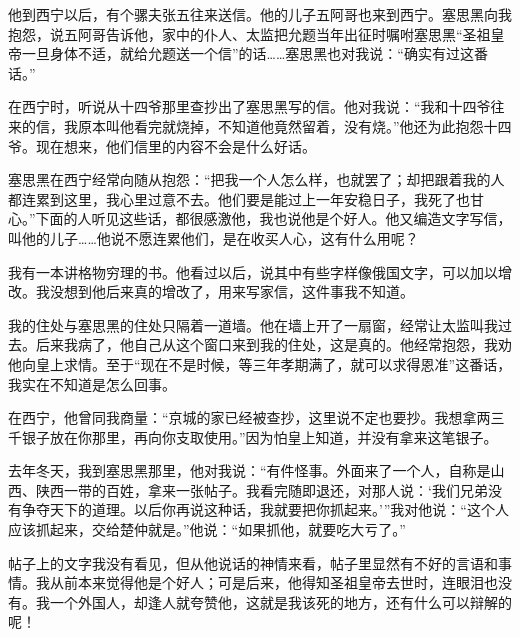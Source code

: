 他到西宁以后，有个骡夫张五往来送信。他的儿子五阿哥也来到西宁。塞思黑向我抱怨，说五阿哥告诉他，家中的仆人、太监把允题当年出征时嘱咐塞思黑“圣祖皇帝一旦身体不适，就给允题送一个信”的话……塞思黑也对我说：“确实有过这番话。”\par
在西宁时，听说从十四爷那里查抄出了塞思黑写的信。他对我说：“我和十四爷往来的信，我原本叫他看完就烧掉，不知道他竟然留着，没有烧。”他还为此抱怨十四爷。现在想来，他们信里的内容不会是什么好话。\par
塞思黑在西宁经常向随从抱怨：“把我一个人怎么样，也就罢了；却把跟着我的人都连累到这里，我心里过意不去。他们要是能过上一年安稳日子，我死了也甘心。”下面的人听见这些话，都很感激他，我也说他是个好人。他又编造文字写信，叫他的儿子……他说不愿连累他们，是在收买人心，这有什么用呢？\par
我有一本讲格物穷理的书。他看过以后，说其中有些字样像俄国文字，可以加以增改。我没想到他后来真的增改了，用来写家信，这件事我不知道。\par
我的住处与塞思黑的住处只隔着一道墙。他在墙上开了一扇窗，经常让太监叫我过去。后来我病了，他自己从这个窗口来到我的住处，这是真的。他经常抱怨，我劝他向皇上求情。至于“现在不是时候，等三年孝期满了，就可以求得恩准”这番话，我实在不知道是怎么回事。\par
在西宁，他曾同我商量：“京城的家已经被查抄，这里说不定也要抄。我想拿两三千银子放在你那里，再向你支取使用。”因为怕皇上知道，并没有拿来这笔银子。\par
去年冬天，我到塞思黑那里，他对我说：“有件怪事。外面来了一个人，自称是山西、陕西一带的百姓，拿来一张帖子。我看完随即退还，对那人说：‘我们兄弟没有争夺天下的道理。以后你再说这种话，我就要把你抓起来。’”我对他说：“这个人应该抓起来，交给楚仲就是。”他说：“如果抓他，就要吃大亏了。”\par
帖子上的文字我没有看见，但从他说话的神情来看，帖子里显然有不好的言语和事情。我从前本来觉得他是个好人；可是后来，他得知圣祖皇帝去世时，连眼泪也没有。我一个外国人，却逢人就夸赞他，这就是我该死的地方，还有什么可以辩解的呢！\par
